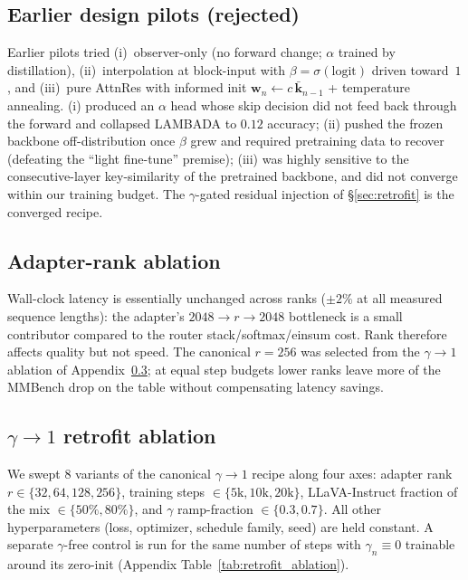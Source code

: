 \documentclass{article}
\begin{document}
\subsection{Earlier design pilots (rejected)}
\label{app:route_ablations}
Earlier pilots tried (i)~observer-only (no forward change; $\alpha$ trained by distillation), (ii)~interpolation at block-input with $\beta{=}\sigma(\text{logit})$ driven toward~$1$, and (iii)~pure AttnRes with informed init $\mathbf{w}_n \gets c\,\bar{\mathbf{k}}_{n-1}$ + temperature annealing. (i) produced an $\alpha$ head whose skip decision did not feed back through the forward and collapsed LAMBADA to $0.12$ accuracy; (ii) pushed the frozen backbone off-distribution once $\beta$ grew and required pretraining data to recover (defeating the ``light fine-tune'' premise); (iii) was highly sensitive to the consecutive-layer key-similarity of the pretrained backbone, and did not converge within our training budget. The $\gamma$-gated residual injection of \S\ref{sec:retrofit} is the converged recipe.

\subsection{Adapter-rank ablation}
\label{app:rank_ablation}
Wall-clock latency is essentially unchanged across ranks ($\pm 2\%$ at all measured sequence lengths): the adapter's $2048{\to}r{\to}2048$ bottleneck is a small contributor compared to the router stack/softmax/einsum cost. Rank therefore affects quality but not speed. The canonical $r{=}256$ was selected from the $\gamma{\to}1$ ablation of Appendix~\ref{app:retrofit_ablation}; at equal step budgets lower ranks leave more of the MMBench drop on the table without compensating latency savings.

\subsection{$\gamma{\to}1$ retrofit ablation}
\label{app:retrofit_ablation}
We swept $8$ variants of the canonical $\gamma{\to}1$ recipe along four axes: adapter rank $r\in\{32,64,128,256\}$, training steps $\in\{5\text{k},10\text{k},20\text{k}\}$, LLaVA-Instruct fraction of the mix $\in\{50\%,80\%\}$, and $\gamma$ ramp-fraction $\in\{0.3,0.7\}$. All other hyperparameters (loss, optimizer, schedule family, seed) are held constant. A separate $\gamma$-free control is run for the same number of steps with $\gamma_n\equiv 0$ trainable around its zero-init (Appendix Table~\ref{tab:retrofit_ablation}).
\end{document}
